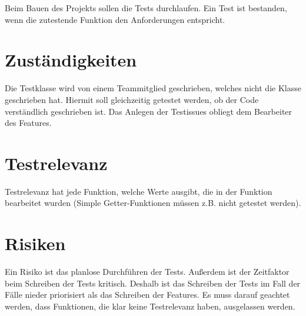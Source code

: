 Beim Bauen des Projekts sollen die Tests durchlaufen.
Ein Test ist bestanden, wenn die zutestende Funktion den Anforderungen entspricht.

\section{Zuständigkeiten}
Die Testklasse wird von einem Teammitglied geschrieben, welches nicht die Klasse geschrieben hat. Hiermit soll
gleichzeitig getestet werden, ob der Code verständlich geschrieben ist.
Das Anlegen der Testissues obliegt dem Bearbeiter des Features.

\section{Testrelevanz}
Testrelevanz hat jede Funktion, welche Werte ausgibt, die in der Funktion bearbeitet wurden
(Simple Getter-Funktionen müssen z.B. nicht getestet werden).

\section{Risiken}
Ein Risiko ist das planlose Durchführen der Tests. 
Außerdem ist der Zeitfaktor beim Schreiben der Tests kritisch.
Deshalb ist das Schreiben der Tests im Fall der Fälle nieder priorisiert als das Schreiben der Features.
Es muss darauf geachtet werden, dass Funktionen, die klar keine Testrelevanz haben, ausgelassen werden.


